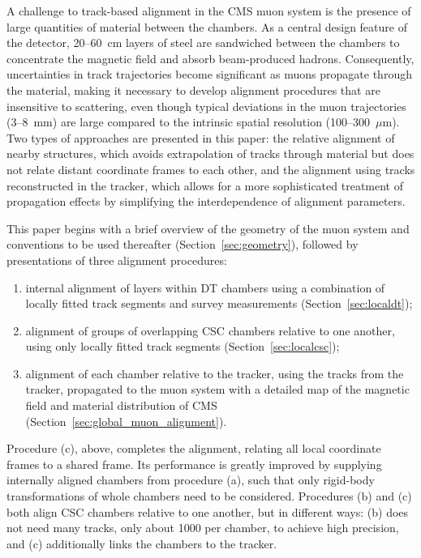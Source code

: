A challenge to track-based alignment in the CMS muon system is the
presence of large quantities of material between the chambers.  As a
central design feature of the detector, 20--60~cm layers of steel
are sandwiched between the chambers to concentrate the magnetic field
and absorb beam-produced hadrons.  Consequently, uncertainties in
track trajectories become significant as muons propagate through the
material, making it necessary to develop alignment procedures that are
insensitive to scattering, even though typical deviations in the muon
trajectories (3--8~mm) are large compared to the intrinsic spatial
resolution (100--300~$\mu$m).  Two types of approaches are presented
in this paper: the relative alignment of nearby structures, which avoids
extrapolation of tracks through material but does not relate distant
coordinate frames to each other, and the alignment using tracks
reconstructed in the tracker, which allows for a more sophisticated
treatment of propagation effects by simplifying the interdependence of
alignment parameters.

This paper begins with a brief overview of the geometry of the muon
system and conventions to be used thereafter
(Section~\ref{sec:geometry}), followed by presentations of three
alignment procedures:
{\renewcommand{\labelenumi}{(\alph{enumi})}
\begin{enumerate}
\item internal alignment of layers within DT chambers using a
combination of locally fitted track segments and survey measurements
(Section~\ref{sec:localdt});
\item alignment of groups of overlapping CSC chambers relative to one
another, using only locally fitted track segments
(Section~\ref{sec:localcsc});
\item alignment of each chamber relative to the tracker, using
the tracks from the tracker, propagated to the muon system with a
detailed map of the magnetic field and material distribution of CMS
(Section~\ref{sec:global_muon_alignment}).
\end{enumerate}}

Procedure (c), above, completes the alignment, relating all
local coordinate frames to a shared frame.  Its performance is greatly
improved by supplying internally aligned chambers from procedure (a),
such that only rigid-body transformations of whole chambers need to be
considered.  Procedures (b) and (c) both align CSC chambers relative
to one another, but in different ways: (b) does not need many tracks,
only about 1000 per chamber, to achieve high precision, and
(c) additionally links the chambers to the tracker.

